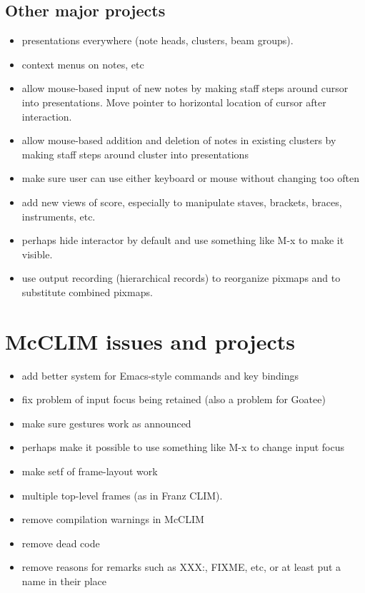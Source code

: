 \subsection{Other major projects}

\begin{itemize}
\item presentations everywhere (note heads, clusters, beam groups). 
\item context menus on notes, etc
\item allow mouse-based input of new notes by making staff steps
  around cursor into presentations.  Move pointer to horizontal
  location of cursor after interaction.
\item allow mouse-based addition and deletion of notes in existing
  clusters by making staff steps around cluster into presentations
\item make sure user can use either keyboard or mouse without changing
  too often
\item add new views of score, especially to manipulate staves,
  brackets, braces, instruments, etc.
\item perhaps hide interactor by default and use something like M-x to
  make it visible. 
\item use output recording (hierarchical records) to reorganize pixmaps
  and to substitute combined pixmaps. 
\end{itemize}

\section{McCLIM issues and projects}

\begin{itemize}
\item add better system for Emacs-style commands and key
  bindings 
\item fix problem of input focus being retained (also a
  problem for Goatee)
\item make sure gestures work as announced
\item perhaps make it possible to use something like M-x to change
  input focus
\item make setf of frame-layout work
\item multiple top-level frames (as in Franz CLIM).
\item remove compilation warnings in McCLIM
\item remove dead code
\item remove reasons for remarks such as XXX:, FIXME, etc, or at least
  put a name in their place
\end{itemize}